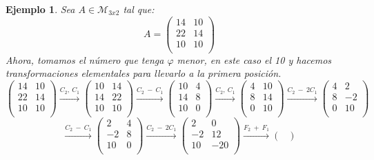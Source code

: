 \documentclass[11pt, a4paper, titlepage]{article}
\newif\IfInSansMode
\theoremstyle{theorem-style}
\theoremstyle{definition-style}
\theoremstyle{remark-style}
\theoremstyle{example-style}
\newtheorem{ejemplo}{Ejemplo}[section]
\begin{document}
\begin{ejemplo}
	Sea $A \in \mathcal{M}_{3x2}$ tal que:
	\[
	A =
	\begin{pmatrix}
 14 & 10 \\
 22 & 14\\
 10 & 10\\
\end{pmatrix}
	\]
	Ahora, tomamos el número que tenga $\varphi$ menor, en este caso el 10 y hacemos transformaciones elementales para llevarlo a la primera posición.
	\[\begin{pmatrix}
 14 & 10 \\
 22 & 14\\
 10 & 10\\
\end{pmatrix} \xrightarrow{C_2,\ C_1}
	\begin{pmatrix}
 10 & 14 \\
 14 & 22\\
 10 & 10\\
\end{pmatrix} \xrightarrow{C_2\ -\ C_1} \begin{pmatrix}
 10 & 4 \\
 14 & 8\\
 10 & 0\\
\end{pmatrix}\xrightarrow{C_2,\ C_1}
\begin{pmatrix}
 4 & 10 \\
 8 & 14\\
 0 & 10\\
\end{pmatrix}\xrightarrow{C_2\ -\ 2C_1}  \begin{pmatrix}
 4 & 2 \\
 8 & -2\\
 0 & 10\\
\end{pmatrix}
	\]
	\[
	\xrightarrow{C_2\ -\ C_1}
	\begin{pmatrix}
 2 & 4 \\
 -2 & 8\\
 10 & 0\\
\end{pmatrix} \xrightarrow{C_2\ -\ 2C_1}
\begin{pmatrix}
 2 & 0 \\
 -2 & 12\\
 10 & -20\\
\end{pmatrix}\xrightarrow{F_2\ +\ F_1}
\begin{pmatrix}

\end{pmatrix}\]
\end{ejemplo}
\end{document}
